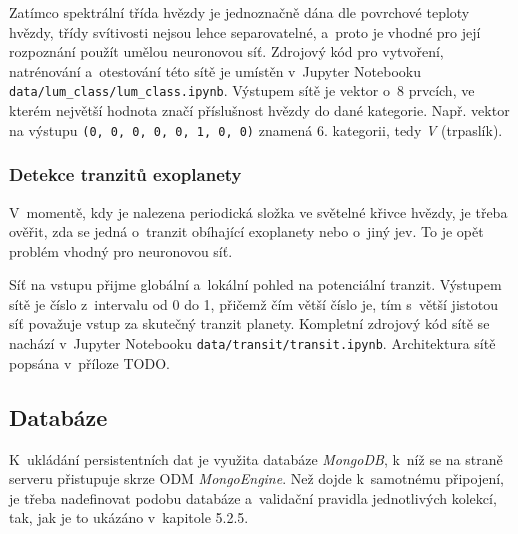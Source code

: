 \documentclass[a4paper,12pt]{article}
\def\code#1{\texttt{#1}}
\begin{document}
{{{{{{{{Zatímco spektrální třída hvězdy je jednoznačně dána dle povrchové teploty hvězdy, třídy svítivosti nejsou lehce separovatelné, a~proto je vhodné pro její rozpoznání použít umělou neuronovou síť. Zdrojový kód pro vytvoření, natrénování a~otestování této sítě je umístěn v~Jupyter Notebooku \code{data/lum\_class/lum\_class.ipynb}. Výstupem sítě je vektor o~8 prvcích, ve kterém největší hodnota značí příslušnost hvězdy do dané kategorie. Např. vektor na výstupu \break\code{(0, 0, 0, 0, 0, 1, 0, 0)} znamená 6. kategorii, tedy \textit{V} (trpaslík).




\subsubsection{Detekce tranzitů exoplanety}

V~momentě, kdy je nalezena periodická složka ve světelné křivce hvězdy, je třeba ověřit, zda se jedná o~tranzit obíhající exoplanety nebo o~jiný jev. To je opět problém vhodný pro neuronovou síť.

Síť na vstupu přijme globální a~lokální pohled na potenciální tranzit. Výstupem sítě je číslo z~intervalu od 0 do 1, přičemž čím větší číslo je, tím s~větší jistotou síť považuje vstup za skutečný tranzit planety. Kompletní zdrojový kód sítě se nachází v~Jupyter Notebooku \code{data/transit/transit.ipynb}. Architektura sítě popsána v~příloze TODO.



\subsection{Databáze}

K~ukládání persistentních dat je využita databáze \textit{MongoDB}, k~níž se na straně serveru přistupuje skrze ODM \textit{MongoEngine}. Než dojde k~samotnému připojení, je třeba nadefinovat podobu databáze a~validační pravidla jednotlivých kolekcí, tak, jak je to ukázáno v~kapitole 5.2.5.



}}}}}}}}
\end{document}
